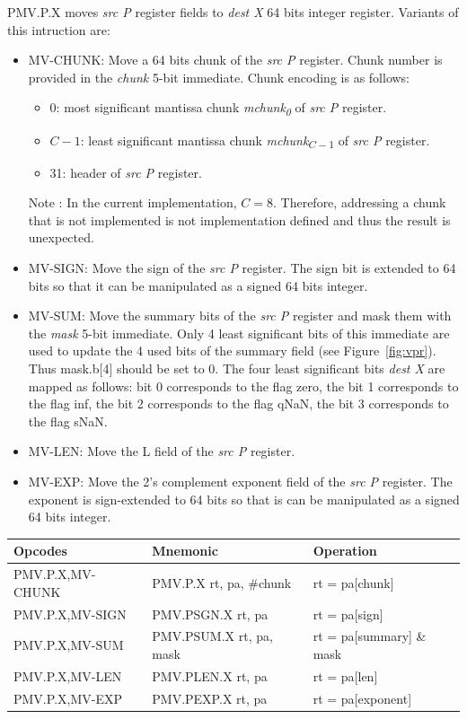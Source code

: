 PMV.P.X moves {\em src P} register fields to {\em dest X} 64 bits integer register.
Variants of this intruction are:
\begin{itemize}[topsep=0pt]
    \item MV-CHUNK: Move a 64 bits chunk of the {\em src P} register.
    Chunk number is provided in the {\em chunk} 5-bit immediate.
    Chunk encoding is as follows:
        \begin{itemize}[noitemsep,topsep=0pt]
            \item 0: most significant mantissa chunk {\em mchunk\textsubscript{0}} of {\em src P} register.
            \item $C-1$: least significant mantissa chunk {\em mchunk\textsubscript{$C-1$}} of {\em src P} register.
            \item 31: header of {\em src P} register.
        \end{itemize}
        Note : In the current implementation, $C=8$. Therefore, addressing a
        chunk that is not implemented is not implementation defined and thus the
        result is unexpected.
    \item MV-SIGN: Move the sign of the {\em src P} register.
    The sign bit is extended to 64 bits so that it can be manipulated as a signed 64 bits integer.
    \item MV-SUM: Move the summary bits of the {\em src P} register and mask them with the {\em mask} 5-bit immediate.
    Only 4 least significant bits of this immediate are used to update the 4 used bits of the summary field (see Figure~\ref{fig:vpr}).
    Thus mask.b[4] should be set to 0.
    The four least significant bits {\em dest X} are mapped as follows: bit 0 corresponds to the flag zero, the bit 1 corresponds to the flag inf, the bit 2 corresponds to the flag qNaN, the bit 3 corresponds to the flag sNaN.
    \item MV-LEN: Move the L field of the {\em src P} register.
    \item MV-EXP: Move the 2's complement exponent field of the {\em src P} register.
    The exponent is sign-extended to 64 bits so that is can be manipulated as a signed 64 bits integer.
\end{itemize}

\begin{center}
    \begin{tabular}{|l|l|t|}
    \hline
    Opcodes   & Mnemonic & Operation \\
    \hline
    PMV.P.X,MV-CHUNK & PMV.P.X rt, pa, \#chunk & rt = pa[chunk]            \\
    \hline
    PMV.P.X,MV-SIGN  & PMV.PSGN.X rt, pa       & rt = pa[sign]             \\
    \hline
    PMV.P.X,MV-SUM   & PMV.PSUM.X rt, pa, mask & rt = pa[summary] \& mask  \\
    \hline
    PMV.P.X,MV-LEN   & PMV.PLEN.X rt, pa       & rt = pa[len]              \\
    \hline
    PMV.P.X,MV-EXP   & PMV.PEXP.X rt, pa       & rt = pa[exponent]         \\
    \hline
    \end{tabular}
\end{center}

